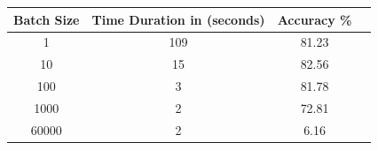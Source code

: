 \documentclass[a4paper,10pt]{article}
\begin{document}
\begin{center}
	\setlength{\arrayrulewidth}{1.0pt}
	\begin{tabular}{|c|c|c|c|}
		\hline
		 \textbf{Batch Size} & \textbf{Time Duration in (seconds)} & \textbf{Accuracy \%}\\ [1.5ex]
		\hline
		1 & 109 &81.23\\
		\hline
		10 & 15 &82.56\\
		\hline
		100 & 3 &81.78\\
		\hline
		1000 & 2 &72.81\\
		\hline
		60000 & 2 &6.16\\
		\hline
	\end{tabular}
\end{center}
\end{document}
